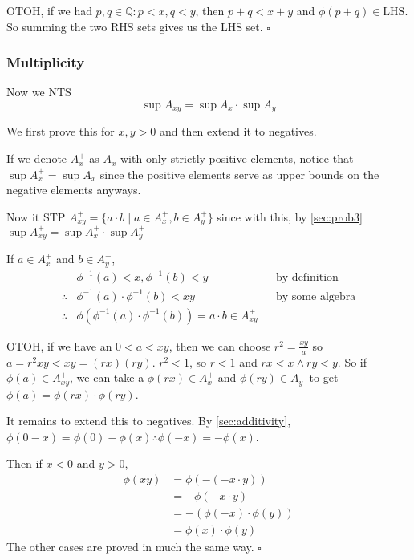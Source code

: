 \documentclass[12pt]{article}
\newcommand{\Q}{\mathbb{Q}}
\begin{document}
OTOH, if we had $p, q \in \Q: p < x, q < y$, then $p+q<x+y$ and $\phi(p+q) \in \text{LHS}$.
So summing the two RHS sets gives us the LHS set. $\square$

\pagebreak

\subsubsection{Multiplicity}

Now we NTS
\[\sup A_{xy}=\sup A_x \cdot \sup A_y\]

We first prove this for $x, y > 0$ and then extend it to negatives.

If we denote $A_x^+$ as $A_x$ with only strictly positive elements, notice that
$\sup A_x^+=\sup A_x$ since the positive elements serve as upper bounds on the negative elements anyways.

Now it STP $A_{xy}^+ = \{a \cdot b \mid a \in A_x^+, b \in A_y^+\}$
since with this, by \ref{sec:prob3} $\sup A_{xy}^+ = \sup A_x^+ \cdot \sup A_y^+$

If $a \in A_x^+$ and $b \in A_y^+$,
\begin{align*}
               & \phi^{-1}(a)<x, \phi^{-1}(b)<y                                          &  & \text{by definition}   \\
  \therefore{} & \phi^{-1}(a) \cdot \phi^{-1}(b)<xy                                      &  & \text{by some algebra} \\
  \therefore{} & \phi\left(\phi^{-1}(a) \cdot \phi^{-1}(b)\right)=a \cdot b \in A_{xy}^+
\end{align*}

OTOH, if we have an $0 < a < xy$, then we can choose $r^2=\frac{xy}{a}$ so $a = r^2xy < xy = (rx)(ry)$.
$r^2 < 1$, so $r < 1$ and $rx < x \land ry < y$.
So if $\phi(a) \in A_{xy}^+$, we can take a $\phi(rx) \in A_x^+$ and
$\phi(ry) \in A_y^+$ to get $\phi(a)=\phi(rx) \cdot \phi(ry)$. 

It remains to extend this to negatives.
By \ref{sec:additivity}, $\phi(0-x)=\phi(0)-\phi(x) \therefore \phi(-x)=-\phi(x)$.

Then if $x<0$ and $y>0$,
\begin{align*}
  \phi(xy)
  &= \phi(-(-x \cdot y)) \\
  &= -\phi(-x \cdot y) \\
  &= -(\phi(-x) \cdot \phi(y)) \\
  &= \phi(x) \cdot \phi(y)
\end{align*}
The other cases are proved in much the same way. $\square$
\end{document}
